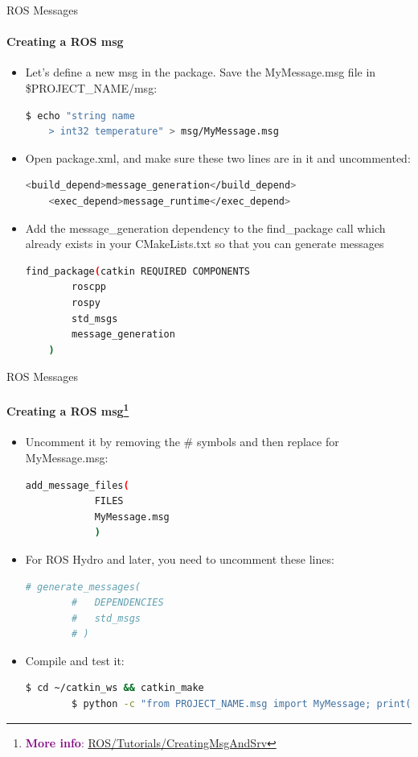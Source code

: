 \documentclass[aspectratio=169]{beamer}
\begin{document}
\begin{frame}[fragile]{ROS Messages}
	\framesubtitle{Creating a ROS msg}
    \begin{itemize}
        \item Let's define a new msg in the package. Save the MyMessage.msg file in \$PROJECT\_NAME/msg:
		\begin{lstlisting}[language=bash]
	$ echo "string name
	> int32 temperature" > msg/MyMessage.msg
		\end{lstlisting}
		\item Open package.xml, and make sure these two lines are in it and uncommented:
		\begin{lstlisting}[language=bash]
	<build_depend>message_generation</build_depend>
	<exec_depend>message_runtime</exec_depend>
		\end{lstlisting}
		\item Add the message\_generation dependency to the find\_package call which already exists in your CMakeLists.txt so that you can generate messages
		\begin{lstlisting}[language=bash]
	find_package(catkin REQUIRED COMPONENTS
		roscpp
		rospy
		std_msgs
		message_generation
	)
		\end{lstlisting}

	
    \end{itemize}
\end{frame}

\begin{frame}[fragile]{ROS Messages}
	\framesubtitle{Creating a ROS msg\footnote[frame]{\textcolor{purple}{\textbf{More info}: \href{http://wiki.ros.org/ROS/Tutorials/CreatingMsgAndSrv}{ROS/Tutorials/CreatingMsgAndSrv}}}}
    \begin{itemize}
        \item Uncomment it by removing the \# symbols and then replace for MyMessage.msg:
		\begin{lstlisting}[language=bash]
		add_message_files(
			FILES
			MyMessage.msg
			)
		\end{lstlisting}
		\item For ROS Hydro and later, you need to uncomment these lines:
		\begin{lstlisting}[language=bash]
	# generate_messages(
		#   DEPENDENCIES
		#   std_msgs
		# )
		\end{lstlisting}
		\item Compile and test it:
		\begin{lstlisting}[language=bash]
		$ cd ~/catkin_ws && catkin_make
		$ python -c "from PROJECT_NAME.msg import MyMessage; print(MyMessage)"
		\end{lstlisting}
    \end{itemize}

\end{frame}
\end{document}
